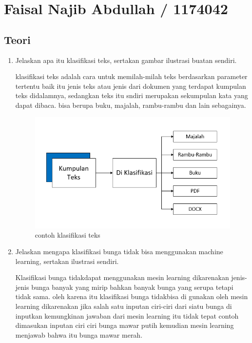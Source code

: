 \section{Faisal Najib Abdullah / 1174042}

\subsection{Teori}
\begin{enumerate}
\item Jelaskan apa itu klasifikasi teks, sertakan gambar ilustrasi buatan sendiri.\par
klasifikasi teks adalah cara untuk memilah-milah teks berdasarkan parameter tertentu baik itu jenis teks atau jenis dari dokumen yang terdapat kumpulan teks didalamnya, sedangkan teks itu sndiri merupakan sekumpulan kata yang dapat dibaca. bisa berupa buku, majalah, rambu-rambu dan lain sebagainya.

\begin{figure}[ht]
\centering
\includegraphics[scale=0.2]{figures/1174042/chapter4/1,1.PNG}
\caption{contoh klasifikasi teks}
\label{contoh}
\end{figure}

\item Jelaskan mengapa klasifikasi bunga tidak bisa menggunakan machine learning, sertakan ilustrasi sendiri.\par
Klasifikasi bunga tidakdapat menggunakan mesin learning dikarenakan jenis-jenis bunga banyak yang mirip bahkan banyak bunga yang serupa tetapi tidak sama. oleh karena itu klasifikasi bunga tidakbisa di gunakan oleh mesin learning dikarenakan jika salah satu inputan ciri-ciri dari siatu bunga di inputkan kemungkinan jawaban dari mesin learning itu tidak tepat contoh dimasukan inputan ciri ciri bunga mawar putih kemudian mesin learning menjawab bahwa itu bunga mawar merah.


\end{enumerate}
